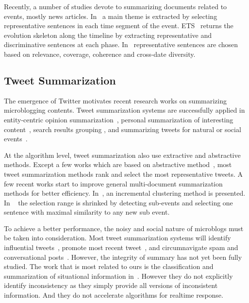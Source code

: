 \documentclass{llncs}
\begin{document}
Recently, a number of studies devote to summarizing documents related to events, mostly news articles. In~\cite{Lin2008Storyline-based} a main theme is extracted by selecting representative sentences in each time segment of the event. ETS~\cite{Wang2009Evolutionary} returns the evolution skeleton along the timeline by extracting representative and discriminative sentences at each phase. In~\cite{Yan2011Evolutionary} representative sentences are chosen based on relevance, coverage, coherence and cross-date diversity.


\subsection{Tweet Summarization}
The emergence of Twitter motivates recent research works on summarizing microblogging contents. Tweet summarization systems are successfully applied in entity-centric opinion summarization~\cite{Meng2012Entitycentric}, personal summarization of interesting content~\cite{Ren2013Personalized,Chin2017TOTEM}, search results grouping \cite{Mathioudakis2010TwitterMonitor}, and summarizing tweets for natural or social events~\cite{Takamura2011Summarizing,Lin2012Generating,Rudra2015Extracting,Shou2013Sumblr,Liu2016LEDS,Gillani2017Post,Zubiaga2012Towards}.

At the algorithm level, tweet summarization also use extractive and abstractive methods. Except a few works which are based on abstractive method~\cite{Sharifi2010Summarizing}, most tweet summarization methods rank and select the most representative tweets. A few recent works start to improve general multi-document summarization methods for better efficiency. In~\cite{Shou2013Sumblr}, an incremental clustering method is presented. In ~\cite{Zubiaga2012Towards} the selection range is shrinked by detecting sub-events and selecting one sentence with maximal similarity to any new sub event.

To achieve a better performance, the noisy and social nature of microblogs must be taken into consideration. Most tweet summarization systems will identify influential tweets~\cite{Hannon2010Recommending},  promote most recent tweet~\cite{Efron2011Estimation}, and circumnavigate spam and conversational posts~\cite{Gillani2017Post}. However, the integrity of summary has not yet been fully studied. The work that is most related to ours is the 
classification and summarization of situational information in~\cite{Rudra2015Extracting,Rudra2016Summarizing}. However they do not explicitly identify inconsistency as they simply provide all versions of inconsistent information. And they do not accelerate algorithms for realtime response. 
\end{document}

